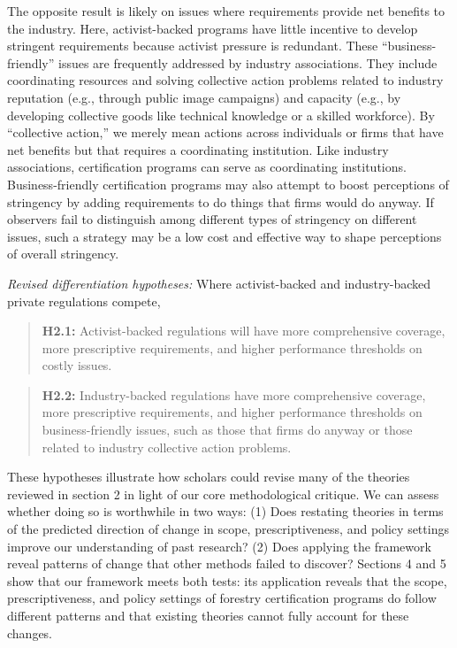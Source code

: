 \documentclass[
      12pt,
            Review ]{article}
\begin{document}
The opposite result is likely on issues where requirements provide net
benefits to the industry. Here, activist-backed programs have little
incentive to develop stringent requirements because activist pressure is
redundant. These ``business-friendly'' issues are frequently addressed
by industry associations. They include coordinating resources and
solving collective action problems related to industry reputation (e.g.,
through public image campaigns) and capacity (e.g., by developing
collective goods like technical knowledge or a skilled workforce). By
``collective action,'' we merely mean actions across individuals or
firms that have net benefits but that requires a coordinating
institution. Like industry associations, certification programs can
serve as coordinating institutions. Business-friendly certification
programs may also attempt to boost perceptions of stringency by adding
requirements to do things that firms would do anyway. If observers fail
to distinguish among different types of stringency on different issues,
such a strategy may be a low cost and effective way to shape perceptions
of overall stringency.

\emph{Revised differentiation hypotheses:} Where activist-backed and
industry-backed private regulations compete,

\begin{quote}
\textbf{H2.1:} Activist-backed regulations will have more comprehensive
coverage, more prescriptive requirements, and higher performance
thresholds on costly issues.
\end{quote}

\begin{quote}
\textbf{H2.2:} Industry-backed regulations have more comprehensive
coverage, more prescriptive requirements, and higher performance
thresholds on business-friendly issues, such as those that firms do
anyway or those related to industry collective action problems.
\end{quote}

These hypotheses illustrate how scholars could revise many of the
theories reviewed in section 2 in light of our core methodological
critique. We can assess whether doing so is worthwhile in two ways: (1)
Does restating theories in terms of the predicted direction of change in
scope, prescriptiveness, and policy settings improve our understanding
of past research? (2) Does applying the framework reveal patterns of
change that other methods failed to discover? Sections 4 and 5 show that
our framework meets both tests: its application reveals that the scope,
prescriptiveness, and policy settings of forestry certification programs
do follow different patterns and that existing theories cannot fully
account for these changes.
\end{document}
